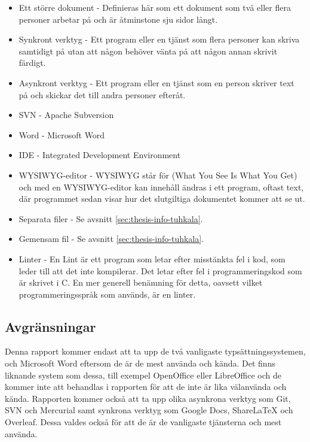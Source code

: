 \begin{itemize}
	\item Ett större dokument - Definieras här som ett dokument som två eller flera personer arbetar på och är åtminstone sju sidor långt.
	\item Synkront verktyg - Ett program eller en tjänst som flera personer kan skriva samtidigt på utan att någon behöver vänta på att någon annan skrivit färdigt.
	\item Asynkront verktyg - Ett program eller en tjänst som en person skriver text på och skickar det till andra personer efteråt.
	\item SVN - Apache Subversion
	\item Word - Microsoft Word
	\item IDE - Integrated Development Environment
	\item WYSIWYG-editor - WYSIWYG står för (What You See Is What You Get) och med en WYSIWYG-editor kan innehåll ändras i ett program, oftast text, där programmet sedan visar hur det slutgiltiga dokumentet kommer att se ut.
	\item Separata filer - Se avsnitt \ref{sec:thesis-info-tuhkala}.
	\item Gemensam fil - Se avsnitt \ref{sec:thesis-info-tuhkala}.
	\item Linter - En Lint \cite{linter} är ett program som letar efter misstänkta fel i kod, som leder till att det inte kompilerar. Det letar efter fel i programmeringskod som är skrivet i C. En mer generell benämning för detta, oavsett vilket programmeringsspråk som används, är en linter.
\end{itemize}

\subsection{Avgränsningar}
Denna rapport kommer endast att ta upp de två vanligaste typsättningssystemen, \latex och Microsoft Word eftersom de är de mest använda och kända. Det finns liknande system som dessa, till exempel OpenOffice eller LibreOffice och de kommer inte att behandlas i rapporten för att de inte är lika välanvända och kända. Rapporten kommer också att ta upp olika asynkrona verktyg som Git, SVN och Mercurial samt synkrona verktyg som Google Docs, ShareLaTeX och Overleaf. Dessa valdes också för att de är de vanligaste tjänsterna och mest använda.

